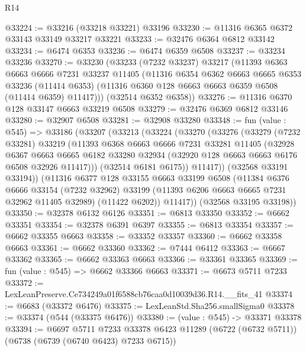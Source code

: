 \begin{lexlean}{R14}
\begin{coremodule}
@33224 := @33216 (@33218 @33221) @33196
@33230 := @11316 @6365 @6372 @33143 @33149 @33217 @33221
@33233 := @32476 @6364 @6812 @33142
@33234 := @6474 @6353
@33236 := @6474 @6359 @6508
@33237 := @33234 @33236
@33270 := @33230
    (@33233
      (@7232 @33237)
      @33217
      (@11393
        @6363
        @6663
        @6666
        @7231
        @33237
        @11405
        (@11316
          @6354
          @6362
          @6663
          @6665
          @6353
          @33236
          (@11414 @6353)
          (@11316 @6360 @128 @6663 @6663 @6359 @6508 (@11414 @6359) @11417)))
      (@32514 @6352 @6358))
@33276 := @11316 @6370 @128 @33147 @6663 @33219 @6508
@33279 := @32476 @6369 @6812 @33146
@33280 := @32907 @6508
@33281 := @32908 @33280
@33348 := fun (value : @545) =>
  @33186
    (@33207
      (@33213
        (@33224
          (@33270
            (@33276
              (@33279
                (@7232 @33281)
                @33219
                (@11393
                  @6368
                  @6663
                  @6666
                  @7231
                  @33281
                  @11405
                  (@32928
                    @6367
                    @6663
                    @6665
                    @6182
                    @33280
                    @32934
                    (@32920 @128 @6663 @6663 @6176 @6508 @32926 @11417)))
                (@32514 @6181 @6175))
              @11417))
          (@32568 @33191 @33194))
        (@11316
          @6377
          @128
          @33155
          @6663
          @33199
          @6508
          (@11384
            @6376
            @6666
            @33154
            (@7232 @32962)
            @33199
            (@11393 @6206 @6663 @6665 @7231 @32962 @11405 @32989)
            (@11422 @6202))
          @11417))
      (@32568 @33195 @33198))
@33350 := @32378 @6132 @6126
@33351 := @6813 @33350
@33352 := @6662 @33351
@33354 := @32378 @6391 @6397
@33355 := @6813 @33354
@33357 := @6662 @33355 @6663
@33358 := @33352 @33357
@33360 := @6662 @33358 @6663
@33361 := @6662 @33360
@33362 := @7444 @6412
@33363 := @6667 @33362
@33365 := @6662 @33363 @6663
@33366 := @33361 @33365
@33369 := fun (value : @545) => @6662 @33366 @6663
@33371 := @6673 @5711 @7233
@33372 := LexLeanPreserve.Ce734249a01f6588cb76caa0d10039d36.R14.__fits_41
@33374 := @6683 (@33372 @6476)
@33375 := LexLeanStd.Sha256.smallSigma0
@33378 := @33374 (@544 (@33375 @6476))
@33380 := (value : @545) -> @33371 @33378
@33394 := @6697
    @5711
    @7233
    @33378
    @6423
    @11289
    (@6722 (@6732 @5711))
    (@6738 (@6739 (@6740 @6423) @7233 @6715))

\end{coremodule}
\end{lexlean}
